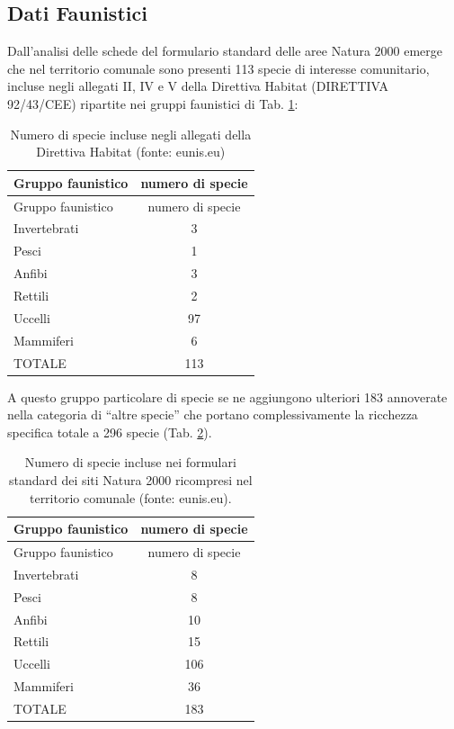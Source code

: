\documentclass[
  a4paper,
]{book}
\begin{document}
\subsection{Dati Faunistici}\label{dati-faunistici}

Dall'analisi delle schede del formulario standard delle aree Natura 2000 emerge che nel territorio comunale sono presenti 113 specie di interesse comunitario, incluse negli allegati II, IV e V della Direttiva Habitat (DIRETTIVA 92/43/CEE) ripartite nei gruppi faunistici di Tab.
\ref{tab:DH}:

\begin{longtable}[]{@{}lc@{}}
\caption{\label{tab:DH} Numero di specie incluse negli allegati della Direttiva Habitat (fonte: eunis.eu)}\tabularnewline
\toprule\noalign{}
Gruppo faunistico & numero di specie \\
\midrule\noalign{}
\endfirsthead
\toprule\noalign{}
Gruppo faunistico & numero di specie \\
\midrule\noalign{}
\endhead
\bottomrule\noalign{}
\endlastfoot
Invertebrati & 3 \\
Pesci & 1 \\
Anfibi & 3 \\
Rettili & 2 \\
Uccelli & 97 \\
Mammiferi & 6 \\
TOTALE & 113 \\
\end{longtable}

A questo gruppo particolare di specie se ne aggiungono ulteriori 183 annoverate nella categoria di ``altre specie'' che portano complessivamente la ricchezza specifica totale a 296 specie (Tab. \ref{tab:DHaltre}).

\begin{longtable}[]{@{}lc@{}}
\caption{\label{tab:DHaltre} Numero di specie incluse nei formulari standard dei siti Natura 2000 ricompresi nel territorio comunale (fonte: eunis.eu).}\tabularnewline
\toprule\noalign{}
Gruppo faunistico & numero di specie \\
\midrule\noalign{}
\endfirsthead
\toprule\noalign{}
Gruppo faunistico & numero di specie \\
\midrule\noalign{}
\endhead
\bottomrule\noalign{}
\endlastfoot
Invertebrati & 8 \\
Pesci & 8 \\
Anfibi & 10 \\
Rettili & 15 \\
Uccelli & 106 \\
Mammiferi & 36 \\
TOTALE & 183 \\
\end{longtable}
\end{document}

